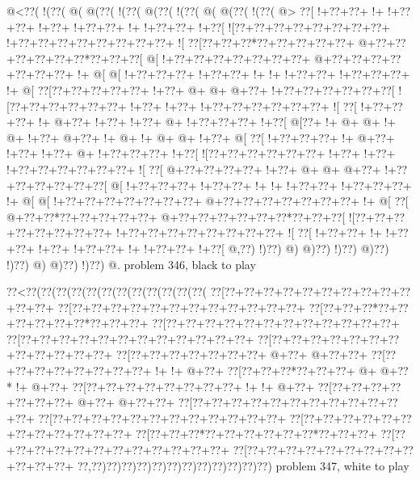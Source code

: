 \vbox{\vbox{\goo
\- @<\0??(\- !(\0??(\- @(\- @(\0??(\- !(\0??(\- @(\0??(\- !(\0??(\- @(\- @(\0??(\- !(\0??(\- @>
\0??[\- !+\0??+\0??+\- !+\- !+\0??+\0??+\- !+\0??+\- !+\0??+\0??+\- !+\- !+\0??+\0??+\- !+\0??[
\- ![\0??+\0??+\0??+\0??+\0??+\0??+\0??+\0??+\- !+\0??+\0??+\0??+\0??+\0??+\0??+\0??+\0??+\- ![
\0??[\0??+\0??+\0??*\0??+\0??+\0??+\0??+\0??+\- @+\0??+\0??+\0??+\0??+\0??+\0??*\0??+\0??+\0??[
\- @[\- !+\0??+\0??+\0??+\0??+\0??+\0??+\0??+\- @+\0??+\0??+\0??+\0??+\0??+\0??+\0??+\- !+\- @[
\- @[\- !+\0??+\0??+\0??+\- !+\0??+\0??+\- !+\- !+\- !+\0??+\0??+\- !+\0??+\0??+\0??+\- !+\- @[
\0??[\0??+\0??+\0??+\0??+\0??+\- !+\0??+\- @+\- @+\- @+\0??+\- !+\0??+\0??+\0??+\0??+\0??+\0??[
\- ![\0??+\0??+\0??+\0??+\0??+\0??+\- !+\0??+\- !+\0??+\- !+\0??+\0??+\0??+\0??+\0??+\0??+\- ![
\0??[\- !+\0??+\0??+\0??+\- !+\- @+\0??+\- !+\0??+\- !+\0??+\- @+\- !+\0??+\0??+\0??+\- !+\0??[
\- @[\0??+\- !+\- @+\- @+\- !+\- @+\- !+\0??+\- @+\0??+\- !+\- @+\- !+\- @+\- @+\- !+\0??+\- @[
\0??[\- !+\0??+\0??+\0??+\- !+\- @+\0??+\- !+\0??+\- !+\0??+\- @+\- !+\0??+\0??+\0??+\- !+\0??[
\- ![\0??+\0??+\0??+\0??+\0??+\0??+\- !+\0??+\- !+\0??+\- !+\0??+\0??+\0??+\0??+\0??+\0??+\- ![
\0??[\- @+\0??+\0??+\0??+\0??+\- !+\0??+\- @+\- @+\- @+\0??+\- !+\0??+\0??+\0??+\0??+\0??+\0??[
\- @[\- !+\0??+\0??+\0??+\- !+\0??+\0??+\- !+\- !+\- !+\0??+\0??+\- !+\0??+\0??+\0??+\- !+\- @[
\- @[\- !+\0??+\0??+\0??+\0??+\0??+\0??+\0??+\- @+\0??+\0??+\0??+\0??+\0??+\0??+\0??+\- !+\- @[
\0??[\- @+\0??+\0??*\0??+\0??+\0??+\0??+\0??+\- @+\0??+\0??+\0??+\0??+\0??+\0??*\0??+\0??+\0??[
\- ![\0??+\0??+\0??+\0??+\0??+\0??+\0??+\0??+\- !+\0??+\0??+\0??+\0??+\0??+\0??+\0??+\0??+\- ![
\0??[\- !+\0??+\0??+\- !+\- !+\0??+\0??+\- !+\0??+\- !+\0??+\0??+\- !+\- !+\0??+\0??+\- !+\0??[
\- @,\0??)\- !)\0??)\- @)\- @)\0??)\- !)\0??)\- @)\0??)\- !)\0??)\- @)\- @)\0??)\- !)\0??)\- @.
}
\hfil problem 346, black to play\hfil\break
}

\vbox{\vbox{\goo
\0??<\0??(\0??(\0??(\0??(\0??(\0??(\0??(\0??(\0??(\0??(\0??(\0??(
\0??[\0??+\0??+\0??+\0??+\0??+\0??+\0??+\0??+\0??+\0??+\0??+\0??+
\0??[\0??+\0??+\0??+\0??+\0??+\0??+\0??+\0??+\0??+\0??+\0??+\0??+
\0??[\0??+\0??+\0??*\0??+\0??+\0??+\0??+\0??+\0??*\0??+\0??+\0??+
\0??[\0??+\0??+\0??+\0??+\0??+\0??+\0??+\0??+\0??+\0??+\0??+\0??+
\0??[\0??+\0??+\0??+\0??+\0??+\0??+\0??+\0??+\0??+\0??+\0??+\0??+
\0??[\0??+\0??+\0??+\0??+\0??+\0??+\0??+\0??+\0??+\0??+\0??+\0??+
\0??[\0??+\0??+\0??+\0??+\0??+\0??+\0??+\- @+\0??+\- @+\0??+\0??+
\0??[\0??+\0??+\0??+\0??+\0??+\0??+\0??+\0??+\- !+\- !+\- @+\0??+
\0??[\0??+\0??+\0??*\0??+\0??+\0??+\- @+\- @+\0??*\- !+\- @+\0??+
\0??[\0??+\0??+\0??+\0??+\0??+\0??+\0??+\0??+\- !+\- !+\- @+\0??+
\0??[\0??+\0??+\0??+\0??+\0??+\0??+\0??+\- @+\0??+\- @+\0??+\0??+
\0??[\0??+\0??+\0??+\0??+\0??+\0??+\0??+\0??+\0??+\0??+\0??+\0??+
\0??[\0??+\0??+\0??+\0??+\0??+\0??+\0??+\0??+\0??+\0??+\0??+\0??+
\0??[\0??+\0??+\0??+\0??+\0??+\0??+\0??+\0??+\0??+\0??+\0??+\0??+
\0??[\0??+\0??+\0??*\0??+\0??+\0??+\0??+\0??+\0??*\0??+\0??+\0??+
\0??[\0??+\0??+\0??+\0??+\0??+\0??+\0??+\0??+\0??+\0??+\0??+\0??+
\0??[\0??+\0??+\0??+\0??+\0??+\0??+\0??+\0??+\0??+\0??+\0??+\0??+
\0??,\0??)\0??)\0??)\0??)\0??)\0??)\0??)\0??)\0??)\0??)\0??)\0??)
}
\hfil problem 347, white to play\hfil\break
}
